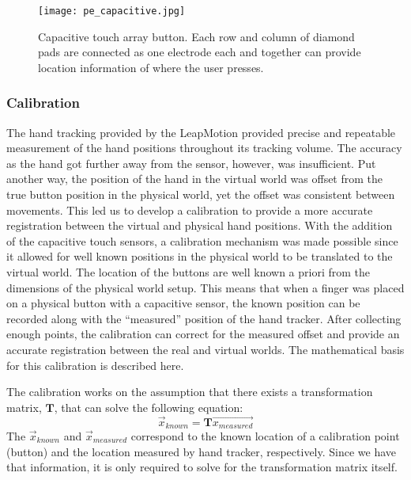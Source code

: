 \begin{figure}
    \centering
    \texttt{[image: pe\_capacitive.jpg]}
    \caption{Capacitive touch array button. Each row and column of diamond pads are connected as one electrode each and together can provide location information of where the user presses.}
    \label{fig:proto_capacitive_array}
\end{figure}

\subsubsection{Calibration}

The hand tracking provided by the LeapMotion provided precise and repeatable measurement of the hand positions throughout its tracking volume.
The accuracy as the hand got further away from the sensor, however, was insufficient.
Put another way, the position of the hand in the virtual world was offset from the true button position in the physical world, yet the offset was consistent between movements.
This led us to develop a calibration to provide a more accurate registration between the virtual and physical hand positions.
With the addition of the capacitive touch sensors, a calibration mechanism was made possible since it allowed for well known positions in the physical world to be translated to the virtual world.
The location of the buttons are well known a priori from the dimensions of the physical world setup.
This means that when a finger was placed on a physical button with a capacitive sensor, the known position can be recorded along with the ``measured'' position of the hand tracker.
After collecting enough points, the calibration can correct for the measured offset and provide an accurate registration between the real and virtual worlds.
The mathematical basis for this calibration is described here.

The calibration works on the assumption that there exists a transformation matrix, $\mathbf{T}$, that can solve the following equation:
\begin{equation}
    \vec{x}_{known} = \mathbf{T}\vec{x_{measured}}
    \label{eq:proto_Tvec}
\end{equation}
The $\vec{x}_{known}$ and $\vec{x}_{measured}$ correspond to the known location of a calibration point (button) and the location measured by hand tracker, respectively.
Since we have that information, it is only required to solve for the transformation matrix itself.

